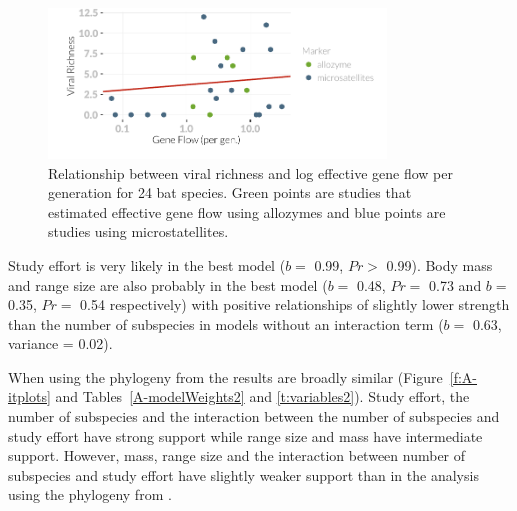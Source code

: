 \begin{knitrout}\footnotesize
{}\color{fgcolor}\begin{figure}[t]

{\centering \includegraphics[width=0.8\textwidth]{figure/fstRawData-1} 

}

\caption[Relationship between viral richness and log effective gene flow per generation for 24 bat species.
]{Relationship between viral richness and log effective gene flow per generation for 24 bat species.
Green points are studies that estimated effective gene flow using allozymes and blue points are studies using microstatellites.
}\label{fig:fstRawData}
\end{figure}


\end{knitrout}




Study effort is very likely in the best model ($b = $ 0.99, $Pr > $ 0.99).
Body mass and range size are also probably in the best model ($b = $ 0.48, $Pr = $ 0.73 and $b = $ 0.35, $Pr = $ 0.54 respectively) with positive relationships of slightly lower strength than the number of subspecies in models without an interaction term ($b = $ 0.63, variance = 0.02).	


When using the phylogeny from \textcite{jones2005bats} the results are broadly similar (Figure~\ref{f:A-itplots} and Tables~\ref{A-modelWeights2} and \ref{t:variables2}).
Study effort, the number of subspecies and the interaction between the number of subspecies and study effort have strong support while range size and mass have intermediate support.
However, mass, range size and the interaction between number of subspecies and study effort have slightly weaker support than in the analysis using the phylogeny from \textcite{bininda2007delayed}.




